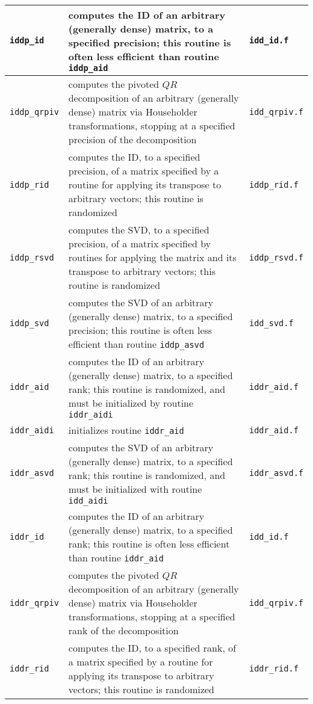\documentclass[letterpaper,12pt]{article}
\begin{document}
\begin{center}
\begin{supertabular}{>{\raggedright}p{1.2in} p{.53\textwidth} l}
\\\hline
%
{\tt iddp\_id} & computes the ID of an arbitrary (generally dense)
matrix, to a specified precision; this routine is often less efficient
than routine {\tt iddp\_aid} & {\tt idd\_id.f} \\\hline
%
{\tt iddp\_qrpiv} & computes the pivoted $QR$ decomposition of an
arbitrary (generally dense) matrix via Householder transformations,
stopping at a specified precision of the decomposition &
{\tt idd\_qrpiv.f} \\\hline
%
{\tt iddp\_rid} & computes the ID, to a specified precision, of a
matrix specified by a routine for applying its transpose to arbitrary
vectors; this routine is randomized & {\tt iddp\_rid.f} \\\hline
%
{\tt iddp\_rsvd} & computes the SVD, to a specified precision, of a
matrix specified by routines for applying the matrix and its transpose
to arbitrary vectors; this routine is randomized & {\tt iddp\_rsvd.f}
\\\hline
%
{\tt iddp\_svd} & computes the SVD of an arbitrary (generally dense)
matrix, to a specified precision; this routine is often less efficient
than routine {\tt iddp\_asvd} & {\tt idd\_svd.f} \\\hline
%
{\tt iddr\_aid} & computes the ID of an arbitrary (generally dense)
matrix, to a specified rank; this routine is randomized, and must be
initialized by routine {\tt iddr\_aidi} & {\tt iddr\_aid.f} \\\hline
%
{\tt iddr\_aidi} & initializes routine {\tt iddr\_aid} &
{\tt iddr\_aid.f} \\\hline
%
{\tt iddr\_asvd} & computes the SVD of an arbitrary (generally dense)
matrix, to a specified rank; this routine is randomized, and must be
initialized with routine {\tt idd\_aidi} & {\tt iddr\_asvd.f}
\\\hline
%
{\tt iddr\_id} & computes the ID of an arbitrary (generally dense)
matrix, to a specified rank; this routine is often less efficient than
routine {\tt iddr\_aid} & {\tt idd\_id.f} \\\hline
%
{\tt iddr\_qrpiv} & computes the pivoted $QR$ decomposition of an
arbitrary (generally dense) matrix via Householder transformations,
stopping at a specified rank of the decomposition & {\tt idd\_qrpiv.f}
\\\hline
%
{\tt iddr\_rid} & computes the ID, to a specified rank, of a matrix
specified by a routine for applying its transpose to arbitrary vectors;
this routine is randomized & {\tt iddr\_rid.f} \\\hline

\end{supertabular}
\end{center}
\end{document}
